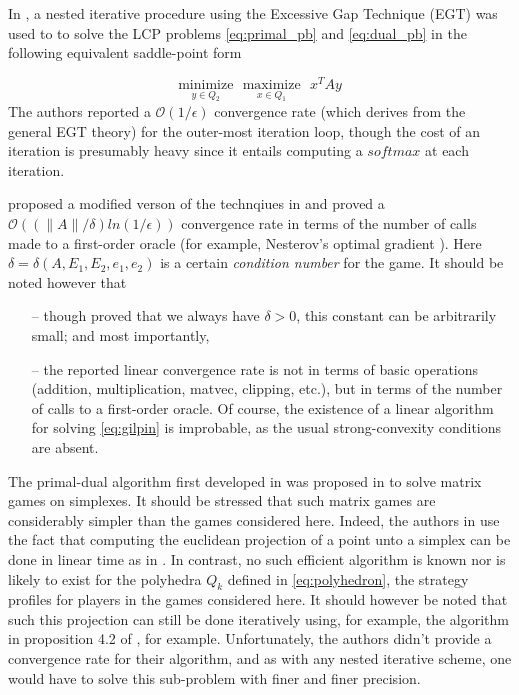 \documentclass[12pt]{article}
\begin{document}
In \cite{hoda2010smoothing}, a nested iterative procedure using the Excessive Gap Technique (EGT) \cite{nesterov2005excessive} was used to to solve the LCP problems \eqref{eq:primal_pb} and \eqref{eq:dual_pb} in the following equivalent saddle-point form

\begin{equation}
  \underset{y \in Q_2}{\text{minimize}}\text{ }\underset{x \in Q_1}{\text{maximize}}\text{ }x^TAy
  \label{eq:gilpin}
\end{equation}
The authors reported a $\mathcal{O}(1/\epsilon)$ convergence rate (which derives from the general EGT theory) for the outer-most iteration loop, though the cost of an iteration is presumably heavy since it entails computing a $softmax$ at each iteration.

\cite{gilpinfirst} proposed a modified verson of the technqiues in \cite{hoda2010smoothing} and  proved a $\mathcal{O}\left(\left(\|A\| / \delta\right) ln\left(1 / \epsilon\right)\right)$ convergence rate in terms of the number of calls made to a first-order oracle (for example, Nesterov's optimal gradient \cite{nesterov1983}). Here $\delta = \delta(A, E_1, E_2, e_1, e_2)$ is a certain \textit{condition number} for the game.
It should be noted however that
\begin{itemize}
\item[--] though \cite{gilpinfirst} proved that we always have $\delta > 0$, this constant can be arbitrarily small; and most importantly,
\item[--] the reported linear convergence rate is not in terms of basic operations (addition, multiplication, matvec, clipping, etc.), but in terms of the number of calls to a first-order oracle. Of course, the existence of a linear algorithm for solving \eqref{eq:gilpin} is improbable, as the usual strong-convexity conditions are absent.
\end{itemize}


The primal-dual algorithm first developed in \cite{chambolle2010} was proposed \cite{chambolle2014ergodic} in to solve matrix games on simplexes. It should be stressed that such matrix games are considerably simpler than the games considered here. Indeed, the authors in \cite{chambolle2014ergodic} use the fact that computing the euclidean projection of a point unto a simplex can be done in linear time as in \cite{duchi2008efficient}. In contrast, no such efficient algorithm is known nor is likely to exist for the polyhedra $Q_k$ defined in \eqref{eq:polyhedron}, the strategy profiles for players in the games considered here. It should however be noted that such this projection can still be done iteratively using, for example, the algorithm in proposition 4.2 of \cite{combettes2010dualization}, for example. Unfortunately, the authors didn't provide a convergence rate for their algorithm, and as with any nested iterative scheme, one would have to solve this sub-problem with finer and finer precision.
\end{document}
